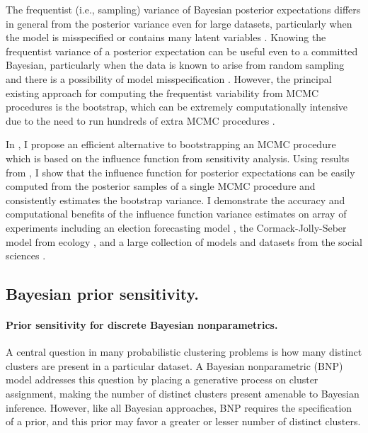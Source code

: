 The frequentist (i.e., sampling) variance of Bayesian posterior expectations
differs in general from the posterior variance even for large datasets,
particularly when the model is misspecified or contains many latent variables
\citep{kleijn:2006:misspecification}.
Knowing the frequentist variance of a posterior expectation can be useful even
to a committed Bayesian, particularly when the data is known to arise from
random sampling and there is a possibility of model misspecification
\citep{waddell:2002:bayesphyloboot}.  However, the
principal existing approach for computing the frequentist variability from MCMC
procedures is the bootstrap, which can be extremely computationally intensive
due to the need to run hundreds of extra MCMC procedures
\citep{huggins:2019:bayesbag}.

In \citep{giordano:2020:bayesij, giordano:2020:stanconbayesij}, I propose an
efficient alternative to bootstrapping an MCMC procedure which is based on the
influence function from sensitivity analysis.  Using results from
\citep{giordano:2018:covariances, giordano:2019:ij}, I show that the influence
function for posterior expectations can be easily computed from the posterior
samples of a single MCMC procedure and consistently estimates the bootstrap
variance. I demonstrate the accuracy and computational benefits of the influence
function variance estimates on array of experiments including an election
forecasting model \citep{economist:2020:election}, the Cormack-Jolly-Seber model
from ecology \citep{kery:2011:bayesian}, and a large collection of models and
datasets from the social sciences \citep{gelman:2006:arm}.

\subsection*{Bayesian prior sensitivity.}

\paragraph{Prior sensitivity for discrete Bayesian nonparametrics.}

A central question in many probabilistic clustering problems is how many
distinct clusters are present in a particular dataset. A Bayesian nonparametric
(BNP) model addresses this question by placing a generative process on cluster
assignment, making the number of distinct clusters present amenable to Bayesian
inference.  However, like all Bayesian approaches, BNP requires the
specification of a prior, and this prior may favor a greater or lesser number of
distinct clusters.

